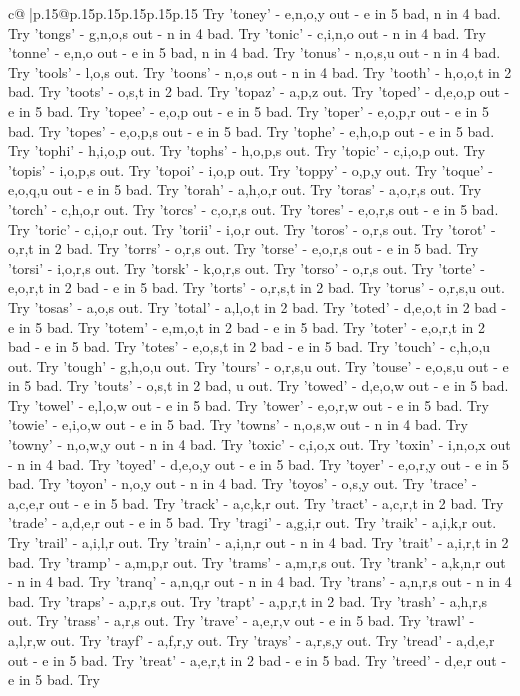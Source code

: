 \documentclass{article}
\begin{document}
{\begin{supertabular}{c@{$\;$}|p{.15\linewidth}@{}p{.15\linewidth}p{.15\linewidth}p{.15\linewidth}p{.15\linewidth}p{.15\linewidth}}
{{{Try 'toney' {-} e,n,o,y out {-} e in 5 bad, n in 4 bad. Try 'tongs' {-} g,n,o,s out {-} n in 4 bad. Try 'tonic' {-} c,i,n,o out {-} n in 4 bad. Try 'tonne' {-} e,n,o out {-} e in 5 bad, n in 4 bad. Try 'tonus' {-} n,o,s,u out {-} n in 4 bad. Try 'tools' {-} l,o,s out. Try 'toons' {-} n,o,s out {-} n in 4 bad. Try 'tooth' {-} h,o,o,t in 2 bad. Try 'toots' {-} o,s,t in 2 bad. Try 'topaz' {-} a,p,z out. Try 'toped' {-} d,e,o,p out {-} e in 5 bad. Try 'topee' {-} e,o,p out {-} e in 5 bad. Try 'toper' {-} e,o,p,r out {-} e in 5 bad. Try 'topes' {-} e,o,p,s out {-} e in 5 bad. Try 'tophe' {-} e,h,o,p out {-} e in 5 bad. Try 'tophi' {-} h,i,o,p out. Try 'tophs' {-} h,o,p,s out. Try 'topic' {-} c,i,o,p out. Try 'topis' {-} i,o,p,s out. Try 'topoi' {-} i,o,p out. Try 'toppy' {-} o,p,y out. Try 'toque' {-} e,o,q,u out {-} e in 5 bad. Try 'torah' {-} a,h,o,r out. Try 'toras' {-} a,o,r,s out. Try 'torch' {-} c,h,o,r out. Try 'torcs' {-} c,o,r,s out. Try 'tores' {-} e,o,r,s out {-} e in 5 bad. Try 'toric' {-} c,i,o,r out. Try 'torii' {-} i,o,r out. Try 'toros' {-} o,r,s out. Try 'torot' {-} o,r,t in 2 bad. Try 'torrs' {-} o,r,s out. Try 'torse' {-} e,o,r,s out {-} e in 5 bad. Try 'torsi' {-} i,o,r,s out. Try 'torsk' {-} k,o,r,s out. Try 'torso' {-} o,r,s out. Try 'torte' {-} e,o,r,t in 2 bad {-} e in 5 bad. Try 'torts' {-} o,r,s,t in 2 bad. Try 'torus' {-} o,r,s,u out. Try 'tosas' {-} a,o,s out. Try 'total' {-} a,l,o,t in 2 bad. Try 'toted' {-} d,e,o,t in 2 bad {-} e in 5 bad. Try 'totem' {-} e,m,o,t in 2 bad {-} e in 5 bad. Try 'toter' {-} e,o,r,t in 2 bad {-} e in 5 bad. Try 'totes' {-} e,o,s,t in 2 bad {-} e in 5 bad. Try 'touch' {-} c,h,o,u out. Try 'tough' {-} g,h,o,u out. Try 'tours' {-} o,r,s,u out. Try 'touse' {-} e,o,s,u out {-} e in 5 bad. Try 'touts' {-} o,s,t in 2 bad, u out. Try 'towed' {-} d,e,o,w out {-} e in 5 bad. Try 'towel' {-} e,l,o,w out {-} e in 5 bad. Try 'tower' {-} e,o,r,w out {-} e in 5 bad. Try 'towie' {-} e,i,o,w out {-} e in 5 bad. Try 'towns' {-} n,o,s,w out {-} n in 4 bad. Try 'towny' {-} n,o,w,y out {-} n in 4 bad. Try 'toxic' {-} c,i,o,x out. Try 'toxin' {-} i,n,o,x out {-} n in 4 bad. Try 'toyed' {-} d,e,o,y out {-} e in 5 bad. Try 'toyer' {-} e,o,r,y out {-} e in 5 bad. Try 'toyon' {-} n,o,y out {-} n in 4 bad. Try 'toyos' {-} o,s,y out. Try 'trace' {-} a,c,e,r out {-} e in 5 bad. Try 'track' {-} a,c,k,r out. Try 'tract' {-} a,c,r,t in 2 bad. Try 'trade' {-} a,d,e,r out {-} e in 5 bad. Try 'tragi' {-} a,g,i,r out. Try 'traik' {-} a,i,k,r out. Try 'trail' {-} a,i,l,r out. Try 'train' {-} a,i,n,r out {-} n in 4 bad. Try 'trait' {-} a,i,r,t in 2 bad. Try 'tramp' {-} a,m,p,r out. Try 'trams' {-} a,m,r,s out. Try 'trank' {-} a,k,n,r out {-} n in 4 bad. Try 'tranq' {-} a,n,q,r out {-} n in 4 bad. Try 'trans' {-} a,n,r,s out {-} n in 4 bad. Try 'traps' {-} a,p,r,s out. Try 'trapt' {-} a,p,r,t in 2 bad. Try 'trash' {-} a,h,r,s out. Try 'trass' {-} a,r,s out. Try 'trave' {-} a,e,r,v out {-} e in 5 bad. Try 'trawl' {-} a,l,r,w out. Try 'trayf' {-} a,f,r,y out. Try 'trays' {-} a,r,s,y out. Try 'tread' {-} a,d,e,r out {-} e in 5 bad. Try 'treat' {-} a,e,r,t in 2 bad {-} e in 5 bad. Try 'treed' {-} d,e,r out {-} e in 5 bad. Try }}}
\end{supertabular}}
\end{document}
